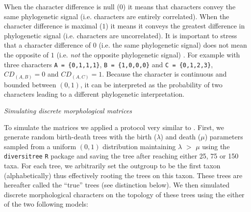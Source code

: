\documentclass[12pt,letterpaper]{article}
\renewcommand{\subsection}[1]{%
\bigskip
\begin{center}
\begin{large}
\normalfont\itshape #1
\end{large}
\end{center}}
\begin{document}
When the character difference is null ($0$) it means that characters convey the same phylogenetic signal (i.e. characters are entirely correlated).
When the character difference is maximal ($1$) it means it conveys the greatest difference in phylogenetic signal (i.e. characters are uncorrelated).
It is important to stress that a character difference of $0$ (i.e. the same phylogenetic signal) does not mean the opposite of $1$ (i.e. \textit{not} the opposite phylogenetic signal) .
For example with three characters \texttt{A = \{0,1,1,1\}}, \texttt{B = \{1,0,0,0\}} and \texttt{C = \{0,1,2,3\}}, $CD_{(A,B)} = 0$ and $CD_{(A,C)} = 1$.
Because the character is continuous and bounded between $(0,1)$, it can be interpreted as the probability of two characters leading to a different phylogenetic interpretation.

\subsection{Simulating discrete morphological matrices}
To simulate the matrices we applied a protocol very similar to \cite{Guillerme2016146}.
First, we generate random birth-death trees with the birth ($\lambda$) and death ($\mu$) parameters sampled from a uniform $(0,1)$ distribution maintaining $\lambda$ $>$ $\mu$ using the \texttt{diversitree} \texttt{R} package \citep[v0.9-8;][]{fitzjohndiversitree2012} and saving the tree after reaching either 25, 75 or 150 taxa.
For each tree, we arbitrarily set the outgroup to be the first taxon (alphabetically) thus effectively rooting the trees on this taxon.
These trees are hereafter called the ``true'' trees (see distinction below).
We then simulated discrete morphological characters on the topology of these trees using the either of the two following models:
\end{document}
